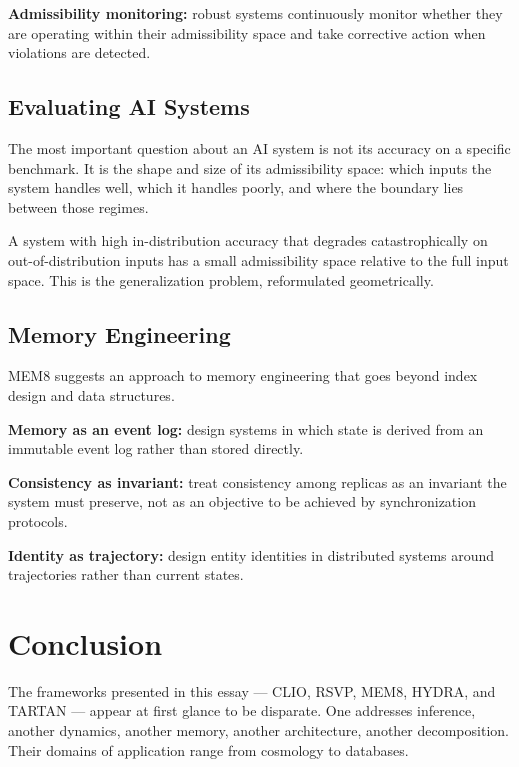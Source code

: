 \documentclass[11pt, a4paper]{article}
\theoremstyle{named}
\begin{document}
\textbf{Admissibility monitoring:} robust systems continuously monitor
whether they are operating within their admissibility space and take
corrective action when violations are detected.

\subsection{Evaluating AI Systems}

The most important question about an AI system is not its accuracy on
a specific benchmark. It is the shape and size of its admissibility
space: which inputs the system handles well, which it handles poorly,
and where the boundary lies between those regimes.

A system with high in-distribution accuracy that degrades
catastrophically on out-of-distribution inputs has a small
admissibility space relative to the full input space. This is the
generalization problem, reformulated geometrically.

\subsection{Memory Engineering}

MEM\textbar{}8 suggests an approach to memory engineering that goes
beyond index design and data structures.

\textbf{Memory as an event log:} design systems in which state is
derived from an immutable event log rather than stored directly.

\textbf{Consistency as invariant:} treat consistency among replicas
as an invariant the system must preserve, not as an objective to be
achieved by synchronization protocols.

\textbf{Identity as trajectory:} design entity identities in
distributed systems around trajectories rather than current states.

\section*{Conclusion}

The frameworks presented in this essay --- CLIO, RSVP,
MEM\textbar{}8, HYDRA, and TARTAN --- appear at first glance to be
disparate. One addresses inference, another dynamics, another memory,
another architecture, another decomposition. Their domains of
application range from cosmology to databases.
\end{document}
